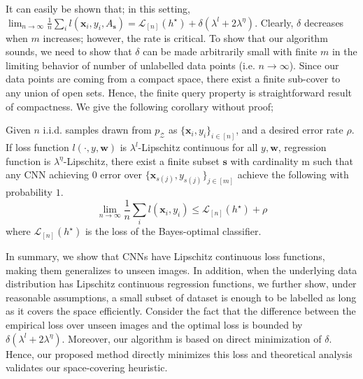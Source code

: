 It can easily be shown that; in this setting, $\lim_{n \rightarrow \infty} \frac{1}{n}\sum_i l(\mathbf{x}_i,y_i,A_\mathbf{s}) =   \mathcal{L}_{[n]} (h^\star) +\delta(\lambda^l + 2 \lambda^{\eta})$. Clearly, $\delta$ decreases when $m$ increases; however, the rate is critical. To show that our algorithm sounds, we need to show that $\delta$ can be made arbitrarily small with finite $m$ in the limiting behavior of number of unlabelled data points (i.e. $n \rightarrow \infty$). Since our data points are coming from a compact space, there exist a finite sub-cover to any union of open sets. Hence, the finite query property is straightforward result of compactness. We give the following corollary without proof;

\begin{cor}
Given $n$ i.i.d. samples drawn from $p_\mathcal{Z}$ as $\{\mathbf{x}_i,y_i\}_{i\in[n]}$, and a desired error rate $\rho$. If loss function $l(\cdot,y,\mathbf{w})$ is $\lambda^l$-Lipschitz continuous for all $y, \mathbf{w}$, regression function is $\lambda^\eta$-Lipschitz, there exist a finite subset $\mathbf{s}$ with cardinality m such that any CNN achieving $0$ error over $\{\mathbf{x}_{s(j)},y_{s(j)}\}_{j \in [m]}$ achieve the following with probability $1$.
\[
\lim_{n \rightarrow \infty} \frac{1}{n}\sum_i l(\mathbf{x}_i,y_i) \leq \mathcal{L}_{[n]} (h^\star) +\rho
\]
where $\mathcal{L}_{[n]} (h^\star)$ is the loss of the Bayes-optimal classifier.
\label{maincor}
\end{cor}

In summary, we show that CNNs have Lipschitz continuous loss functions, making them generalizes to unseen images. In addition, when the underlying data distribution has Lipschitz continuous regression functions, we further show, under reasonable assumptions, a small subset of dataset is enough to be labelled as long as it covers the space efficiently. Consider the fact that the difference between the empirical loss over unseen images and the optimal loss is bounded by $\delta(\lambda^l + 2 \lambda^{\eta})$. Moreover, our algorithm is based on direct minimization of $\delta$. Hence, our proposed method directly minimizes this loss and theoretical analysis validates our space-covering heuristic.

